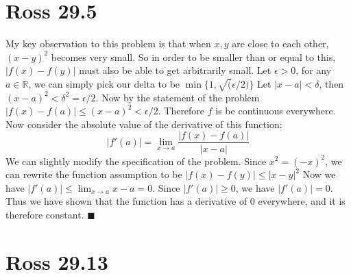 \documentclass[12pt]{article}
\newcommand{\R}{\mathbb{R}}
\begin{document}
\section{Ross 29.5}
My key observation to this problem is that when $x,y$ are close to each other, $(x-y)^2$ becomes very small. So in order to be smaller than or equal to this, $|f(x)-f(y)|$ must also be able to get arbitrarily small.
\newline
Let $\epsilon > 0$, for any $a \in \R$, we can simply pick our delta to be $\min\{1, \sqrt(\epsilon/2)\}$ Let $|x-a|<\delta$, then $(x-a)^2 < \delta ^2 = \epsilon/2$. Now by the statement of the problem $|f(x)-f(a)|\leq (x-a)^2 <\epsilon/2$. Therefore $f$ is be continuous everywhere.
\newline
Now consider the absolute value of the derivative of this function:
$$|f'(a)| = \lim_{x \to a}\frac{|f(x)-f(a)|}{|x-a|}$$
We can slightly modify the specification of the problem. Since $x^2 = (-x)^2$, we can rewrite the function assumption to be $|f(x)-f(y)|\leq |x-y|^2$
\newline
Now we have $|f'(a)| \leq \lim_{x \to a}x - a = 0$. Since $|f'(a)| \geq 0$, we have $|f'(a)| = 0$. Thus we have shown that the function has a derivative of $0$ everywhere, and it is therefore constant.
$\blacksquare$


\section{Ross 29.13}
\end{document}
